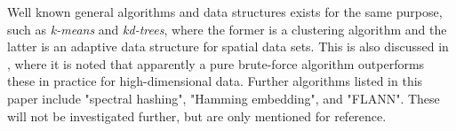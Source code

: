Well known general algorithms and data structures exists for the same purpose, such as \textit{k-means} and \textit{kd-trees}, where the former is a clustering algorithm and the latter is an adaptive data structure for spatial data sets. This is also discussed in \cite{schmid9}, where it is noted that apparently a pure brute-force algorithm outperforms these in practice for high-dimensional data. Further algorithms listed in this paper include "spectral hashing"\cite{weiss8}, "Hamming embedding"\cite{jegou8}, and "FLANN"\cite{muja9}. These will not be investigated further, but are only mentioned for reference.

